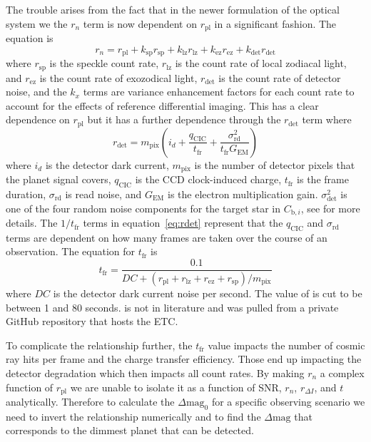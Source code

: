 The trouble arises from the fact that in the newer formulation of the optical
system we the $r_n$ term is now dependent on $r_\textrm{pl}$ in a significant
fashion. The equation is
\begin{equation}
  r_n = r_\textrm{pl} + k_\textrm{sp} r_\textrm{sp} + k_\textrm{lz} r_\textrm{lz}+ k_\textrm{ez} r_\textrm{ez}+ k_\textrm{det} r_\textrm{det}
  \label{eq:rn}
\end{equation}
where $r_\textrm{sp}$ is the speckle count rate, $r_\textrm{lz}$ is the count
rate of local zodiacal light, and $r_\textrm{ez}$ is the count rate of
exozodical light, $r_\textrm{det}$ is the count rate of detector noise, and the
$k_x$ terms are variance enhancement factors for each count rate to account for
the effects of reference differential imaging. This has a clear dependence on
$r_\textrm{pl}$ but it has a further dependence through the $r_\textrm{det}$ term
where
\begin{equation}
  r_\textrm{det} =  m_\textrm{pix}\left( i_d +
  \frac{q_\textrm{CIC}}{t_\textrm{fr}} +
\frac{\sigma^2_\textrm{rd}}{t_\textrm{fr} G_\textrm{EM}} \right)
  \label{eq:rdet}
\end{equation}
where $i_d$ is the detector dark current, $m_{\textrm{pix}}$ is the number of
detector pixels that the planet signal covers, $q_{\textrm{CIC}}$ is the CCD
clock-induced charge, $t_{\textrm{fr}}$ is the frame duration,
$\sigma_{\textrm{rd}}$ is read noise, and $G_{\textrm{EM}}$ is the electron
multiplication gain. $\sigma_{\textrm{det}}^2$ is one of the four random noise
components for the target star in $C_{\textrm{b},i}$, see \citet{Nemati2020a}
for more details. The $1/t_{\textrm{fr}}$ terms in
equation~\ref{eq:rdet} represent that the $q_\textrm{CIC}$
and $\sigma_\textrm{rd}$ terms are dependent on how many frames are taken over
the course of an observation. The equation for $t_\textrm{fr}$ is 
\begin{equation}
  t_{\textrm{fr}} = \frac{0.1}{DC +\left(r_{\textrm{pl}}+r_{\textrm{lz}}+r_{\textrm{ez}}+r_{\textrm{sp}}\right)/m_{\textrm{pix}}}
  \label{eq:bijan_frame_duration}
\end{equation}
where $DC$ is the detector dark current noise per second. The value of
 is cut to be between 1 and 80 seconds.
 is not in literature and was pulled from a
private GitHub repository that hosts the ETC.

To complicate the relationship further, the $t_{\textrm{fr}}$ value impacts the
number of cosmic ray hits per frame and the charge transfer efficiency. Those
end up impacting the detector degradation which then impacts all count
rates. 
By making $r_n$ a complex function of $r_\textrm{pl}$ we are unable to isolate
it as a function of SNR, $r_n$, $r_{\Delta I}$, and $t$ analytically. Therefore
to calculate the $\Delta\textrm{mag}_0$ for a specific observing scenario we
need to invert the relationship numerically and to find the $\Delta\textrm{mag}$
that corresponds to the dimmest planet that can be detected.

